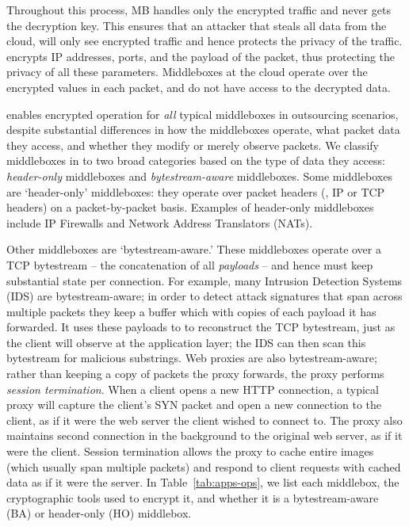 Throughout this process, MB handles only the encrypted traffic and never gets the decryption key. This ensures
that an attacker that steals all data from the cloud, will only see encrypted traffic and hence protects the privacy of the 
traffic. 
\sys encrypts IP addresses, ports, and the payload of the packet, thus protecting the privacy of all these parameters. 
Middleboxes at the cloud operate over the encrypted values in each packet, and do not have access to the decrypted data.

\sys enables encrypted operation for {\em all} typical middleboxes in outsourcing scenarios, despite substantial differences in how the middleboxes operate, what packet data they access, and whether they modify or merely observe packets.
  We classify middleboxes in to two broad categories based on the type of data they access: {\em header-only} middleboxes and {\em bytestream-aware} middleboxes.
  Some middleboxes are `header-only' middleboxes: they operate over packet headers (\eg{}, IP or TCP headers) on a packet-by-packet basis.
Examples of header-only middleboxes include IP Firewalls and Network Address Translators (NATs).

  Other middleboxes are `bytestream-aware.' These middleboxes operate over a TCP bytestream -- the concatenation of all {\it payloads} -- and hence must keep substantial state per connection.
  For example, many Intrusion Detection Systems (IDS) are bytestream-aware; in order to detect attack signatures that span across multiple packets they keep a buffer which with copies of each payload it has forwarded.
  It uses these payloads to to reconstruct the TCP bytestream, just as the client will observe at the application layer; the IDS can then scan this bytestream for malicious substrings.
  Web proxies are also bytestream-aware; rather than keeping a copy of packets the proxy forwards, the proxy performs {\it session termination}. 
  When a client opens a new HTTP connection, a typical proxy will capture the client's SYN packet and open a new connection to the client, as if it were the web server the client wished to connect to. 
  The proxy also maintains second connection in the background to the original web server, as if it were the client. 
  Session termination allows the proxy to cache entire images (which usually span multiple packets) and respond to client requests with cached data as if it were the server.
  In Table~\ref{tab:apps-ops}, we list each middlebox, the cryptographic tools used to encrypt it, and whether it is a bytestream-aware (BA) or header-only (HO) middlebox.

